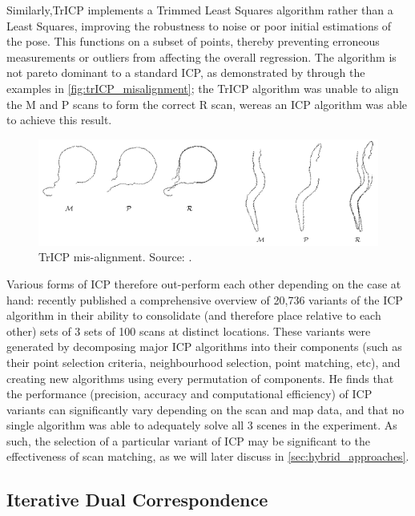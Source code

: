 \documentclass[authoryearcitations]{UoYCSproject}
\begin{document}
Similarly,TrICP \cite{Chetverikov2005-yz} implements a Trimmed Least Squares \cite{Ruppert1980-js} algorithm rather than a Least Squares, improving the robustness to noise or poor initial estimations of the pose. This functions on a subset of points, thereby preventing erroneous measurements or outliers from affecting the overall regression. The algorithm is not pareto dominant to a standard ICP, as demonstrated by \citeauthor{Chetverikov2005-yz} through the examples in \autoref{fig:trICP_misalignment}; the TrICP algorithm was unable to align the M and P scans to form the correct R scan, wereas an ICP algorithm was able to achieve this result. 


\begin{figure}[t]
	\centering
	\includegraphics[width=\textwidth,keepaspectratio]{images/trICP_misalignment.png}
	\caption[TrICP mis-alignment]{TrICP mis-alignment. Source: \citet{Chetverikov2005-yz}.}
	\label{fig:trICP_misalignment}
\end{figure}

Various forms of ICP therefore out-perform each other depending on the case at hand: \citet{Donoso2017-wp} recently published a comprehensive overview of 20,736 variants of the ICP algorithm in their ability to consolidate (and therefore place relative to each other) sets of 3 sets of 100 scans at distinct locations. These variants were generated by decomposing major ICP algorithms into their components (such as their point selection criteria, neighbourhood selection, point matching, etc), and creating new algorithms using every permutation of components. He finds that the performance (precision, accuracy and computational efficiency) of ICP variants can significantly vary depending on the scan and map data, and that no single algorithm was able to adequately solve all 3 scenes in the experiment. As such, the selection of a particular variant of ICP may be significant to the effectiveness of scan matching, as we will later discuss in \ref{sec:hybrid_approaches}.


\subsection{Iterative Dual Correspondence}
\end{document}
